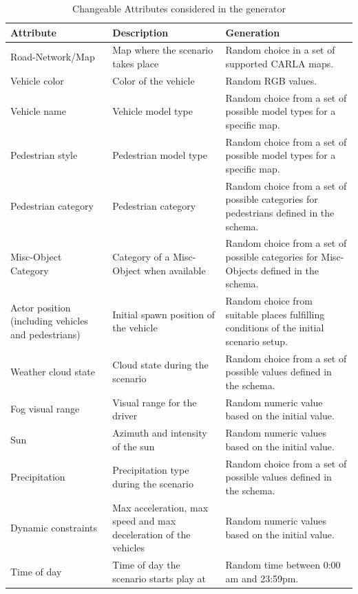 \documentclass[conference, a4paper, 11pt]{IEEEtran}
\begin{document}
	\begin{table}
		\renewcommand{\arraystretch}{1.2}
		\caption{Changeable Attributes considered in the generator}
		\label{attribute_table}
		\centering
		\begin{tabularx}{\linewidth}{p{2cm}|p{2cm}|p{3.5cm}}
			\hline
			\bfseries Attribute & \bfseries Description & \bfseries Generation \\
			\hline\hline
			Road-Network/Map & Map where the scenario takes place & Random choice in a set of supported CARLA maps.  \\ \hline
			Vehicle color  & Color of the vehicle & Random RGB values. \\ \hline
			Vehicle name & Vehicle model type & Random choice from  a set of possible model types for a specific map. \\ \hline
			Pedestrian style & Pedestrian model type & Random choice from  a set of possible model types for a specific map. \\ \hline
			Pedestrian category & Pedestrian category & Random choice from a set of possible categories for pedestrians defined in the schema. \\ \hline
			Misc-Object Category & Category of a Misc-Object when available & Random choice from a set of possible categories for Misc-Objects defined in the schema. \\ \hline
			Actor position (including vehicles and pedestrians) & Initial spawn position of the vehicle & Random choice from suitable places fulfilling conditions of the initial scenario setup. \\ \hline
			Weather cloud state & Cloud state during the scenario & Random choice from a set of possible values defined in the schema. \\ \hline
			Fog visual range & Visual range for the driver & Random numeric value based on the initial value. \\ \hline
			Sun & Azimuth and intensity of the sun & Random numeric values based on the initial value. \\ \hline
			Precipitation & Precipitation type during the scenario & Random choice from a set of possible values defined in the schema. \\ \hline
			Dynamic constraints & Max acceleration, max speed and max deceleration of the vehicles  & Random numeric values based on the initial value. \\ \hline
			Time of day & Time of day the scenario starts play at & Random time between 0:00 am and 23:59pm. \\ \hline
		\end{tabularx}
	\end{table}
\end{document}
